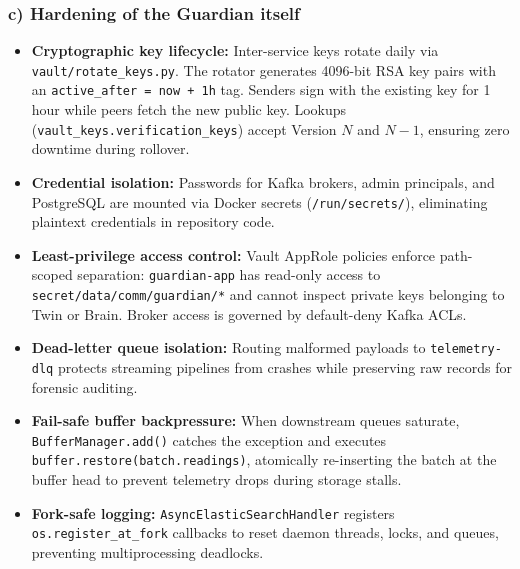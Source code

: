 \documentclass[11pt,a4paper]{article}
\begin{document}
\subsubsection{c) Hardening of the Guardian itself}
\begin{itemize}[leftmargin=*,itemsep=1pt,topsep=2pt]
  \item \textbf{Cryptographic key lifecycle:} Inter-service keys rotate daily via \texttt{vault/rotate\_keys.py}. The rotator generates 4096-bit RSA key pairs with an \texttt{active\_after = now + 1h} tag. Senders sign with the existing key for 1 hour while peers fetch the new public key. Lookups (\texttt{vault\_keys.verification\_keys}) accept Version $N$ and $N-1$, ensuring zero downtime during rollover.
  \item \textbf{Credential isolation:} Passwords for Kafka brokers, admin principals, and PostgreSQL are mounted via Docker secrets (\texttt{/run/secrets/}), eliminating plaintext credentials in repository code.
  \item \textbf{Least-privilege access control:} Vault AppRole policies enforce path-scoped separation: \texttt{guardian-app} has read-only access to \texttt{secret/data/comm/guardian/*} and cannot inspect private keys belonging to Twin or Brain. Broker access is governed by default-deny Kafka ACLs.
  \item \textbf{Dead-letter queue isolation:} Routing malformed payloads to \texttt{telemetry-dlq} protects streaming pipelines from crashes while preserving raw records for forensic auditing.
  \item \textbf{Fail-safe buffer backpressure:} When downstream queues saturate, \texttt{BufferManager.add()} catches the exception and executes \texttt{buffer.restore(batch.readings)}, atomically re-inserting the batch at the buffer head to prevent telemetry drops during storage stalls.
  \item \textbf{Fork-safe logging:} \texttt{AsyncElasticSearchHandler} registers \texttt{os.register\_at\_fork} callbacks to reset daemon threads, locks, and queues, preventing multiprocessing deadlocks.
\end{itemize}
\end{document}
